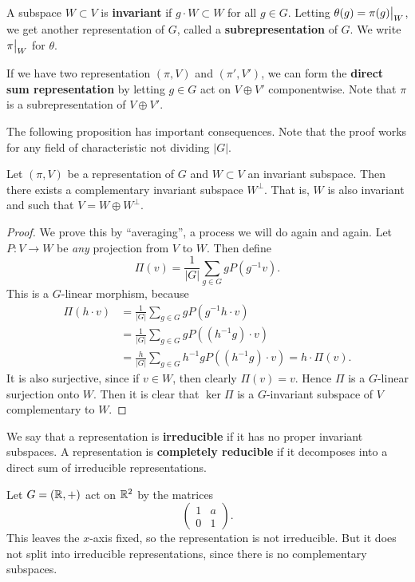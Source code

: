 \documentclass[11pt, english]{article}
\begin{document}
A subspace $W \subset V$ is \textbf{invariant} if $g \cdot W \subset W$ for all $g \in G$. Letting $\theta(g) = \restr{\pi(g)}{W}$, we get another representation of $G$, called a \textbf{subrepresentation} of $G$. We write $\restr{\pi}{W}$ for $\theta$. 

If we have two representation $(\pi,V)$ and $(\pi',V')$, we can form the \textbf{direct sum representation} by letting $g \in G$ act on $V \oplus V'$ componentwise. Note that $\pi$ is a subrepresentation of $V \oplus V'$.

The following proposition has important consequences. Note that the proof works for any field of characteristic not dividing $\lvert G \rvert$. 

\begin{prop}
\label{propmaschke}
Let $(\pi,V)$ be a representation of $G$ and $W \subset V$ an invariant subspace. Then there exists a complementary invariant subspace $W^\perp$. That is, $W$ is also invariant and such that $V = W \oplus W^\perp$.
\end{prop}

\begin{proof}
  We prove this by ``averaging'', a process we will do again and again. Let $P:V \to W$ be \emph{any} projection from $V$ to $W$. Then define 
\[
\Pi(v) = \frac 1{\lvert G \rvert} \sum_{g \in G} g P(g^{-1}v).
\]
This is a $G$-linear morphism, because
\begin{align*}
\Pi(h\cdot v) &= \frac 1{\lvert G \rvert} \sum_{g \in G} g P(g^{-1} h \cdot v) \\  
&=  \frac 1{\lvert G \rvert} \sum_{g \in G} g P((h^{-1}g) \cdot v) \\
&=  \frac h{\lvert G \rvert} \sum_{g \in G} h^{-1}g P((h^{-1}g) \cdot v) = h \cdot \Pi(v).
\end{align*}
It is also surjective, since if $v \in W$, then clearly $\Pi(v)=v$. Hence $\Pi$ is a $G$-linear surjection onto $W$. Then it is clear that $\ker \Pi$ is a $G$-invariant subspace of $V$ complementary to $W$.
\end{proof}

We say that a representation is \textbf{irreducible} if it has no proper invariant subspaces. A representation is \textbf{completely reducible} if it decomposes into a direct sum of irreducible representations.

\begin{example}
  Let $G = (\mathbb{R},+)$ act on $\mathbb{R}^2$ by the matrices
\[
\begin{pmatrix}
1 & a \\ 
0 & 1
\end{pmatrix}.
\]
This leaves the $x$-axis fixed, so the representation is not irreducible. But it does not split into irreducible representations, since there is no complementary subspaces.
\end{example}
\end{document}
